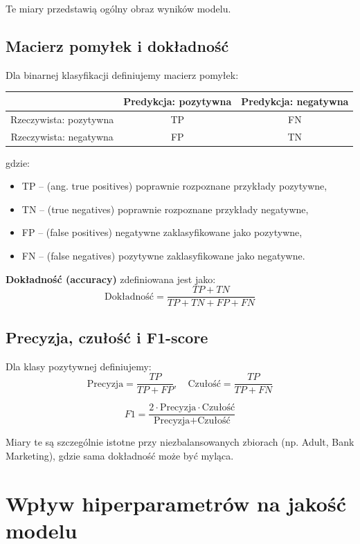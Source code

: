 \documentclass[a4paper]{article}
\begin{document}
Te miary przedstawią ogólny obraz wyników modelu.

\subsection{Macierz pomyłek i dokładność}

Dla binarnej klasyfikacji definiujemy macierz pomyłek:

\begin{center}
\begin{tabular}{c|cc}
 & Predykcja: pozytywna & Predykcja: negatywna \\
\hline
Rzeczywista: pozytywna & TP & FN \\
Rzeczywista: negatywna & FP & TN \\
\end{tabular}
\end{center}

\noindent gdzie:
\begin{itemize}
    \item TP -- (ang. true positives) poprawnie rozpoznane przykłady pozytywne,
    \item TN -- (true negatives) poprawnie rozpoznane przykłady negatywne,
    \item FP -- (false positives) negatywne zaklasyfikowane jako pozytywne,
    \item FN -- (false negatives) pozytywne zaklasyfikowane jako negatywne.
\end{itemize}
\textbf{Dokładność (accuracy)} zdefiniowana jest jako:
\[
\text{Dokładność} = \frac{TP + TN}{TP + TN + FP + FN}
\]

\subsection{Precyzja, czułość i F1-score}

Dla klasy pozytywnej definiujemy:
\[
\text{Precyzja} = \frac{TP}{TP + FP}, \quad
\text{Czułość} = \frac{TP}{TP + FN}
\]

\[
F1 = \frac{2 \cdot \text{Precyzja} \cdot \text{Czułość}}{\text{Precyzja} + \text{Czułość}}
\]

Miary te są szczególnie istotne przy niezbalansowanych zbiorach (np. Adult, Bank Marketing), gdzie sama dokładność może być myląca.

\section{Wpływ hiperparametrów na jakość modelu}
\end{document}
